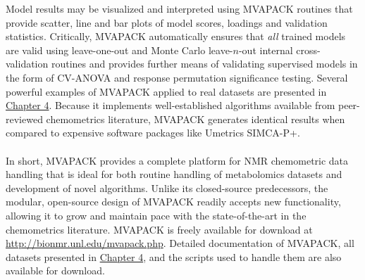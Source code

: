 \begin{doublespace}
Model results may be visualized and interpreted using MVAPACK routines that
provide scatter, line and bar plots of model scores, loadings and validation
statistics. Critically, MVAPACK automatically ensures that {\it all} trained
models are valid using leave-one-out and Monte Carlo leave-$n$-out internal
cross-validation routines and provides further means of validating supervised
models in the form of CV-ANOVA and response permutation significance testing.
Several powerful examples of MVAPACK applied to real datasets are presented in
\hyperlink{chapter.4}{Chapter 4}. Because it implements well-established
algorithms available from peer-reviewed chemometrics literature, MVAPACK
generates identical results when compared to expensive software packages
like Umetrics SIMCA-P+.
\\\\
In short, MVAPACK provides a complete platform for NMR chemometric data
handling that is ideal for both routine handling of metabolomics datasets and
development of novel algorithms. Unlike its closed-source predecessors, the
modular, open-source design of MVAPACK readily accepts new functionality,
allowing it to grow and maintain pace with the state-of-the-art in the
chemometrics literature. MVAPACK is freely available for download at
\url{http://bionmr.unl.edu/mvapack.php}. Detailed documentation of MVAPACK,
all datasets presented in \hyperlink{chapter.4}{Chapter 4}, and the scripts
used to handle them are also available for download.
\end{doublespace}




